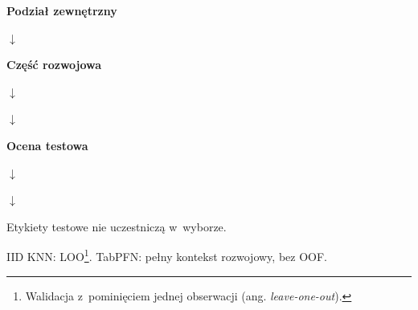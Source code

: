 \begin{minipage}{\linewidth}
\begin{minipage}[t]{0.31\linewidth}\centering\textbf{Podział zewnętrzny}\par\medskip
{}\par\smallskip$\downarrow$\par\smallskip{}\end{minipage}
\hfill
\begin{minipage}[t]{0.31\linewidth}\centering\textbf{Część rozwojowa}\par\medskip
{}\par\smallskip$\downarrow$\par\smallskip{}\par\smallskip$\downarrow$\par\smallskip{}\end{minipage}
\hfill
\begin{minipage}[t]{0.31\linewidth}\centering\textbf{Ocena testowa}\par\medskip
{}\par\smallskip$\downarrow$\par\smallskip{}\par\smallskip$\downarrow$\par\smallskip{}\end{minipage}\par\medskip Etykiety testowe nie uczestniczą w~wyborze.\par IID KNN: LOO\footnote{Walidacja z~pominięciem jednej obserwacji (ang. \textit{leave-one-out}).}. TabPFN: pełny kontekst rozwojowy, bez OOF.
\end{minipage}

